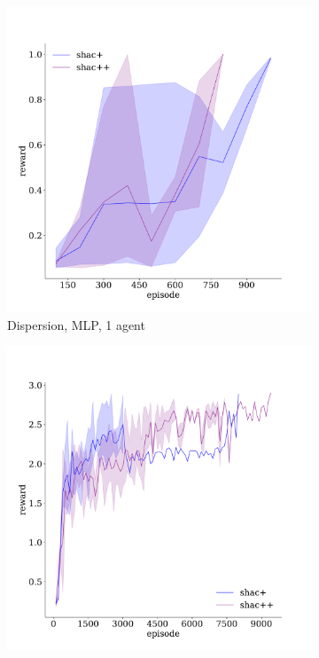\begin{figure}[!t]
    \centering
    \begin{subfigure}[b]{0.32\textwidth}
        \includegraphics[width=\textwidth]{figs/dispersion-ablation-1-mlp.pdf}
        \caption{Dispersion, MLP, 1 agent}
        \label{fig:dispersion-ablation-mlp-1}
    \end{subfigure}
    \begin{subfigure}[b]{0.32\textwidth}
        \includegraphics[width=\textwidth]{figs/dispersion-ablation-3-transformer.pdf}

\end{subfigure}
\end{figure}
